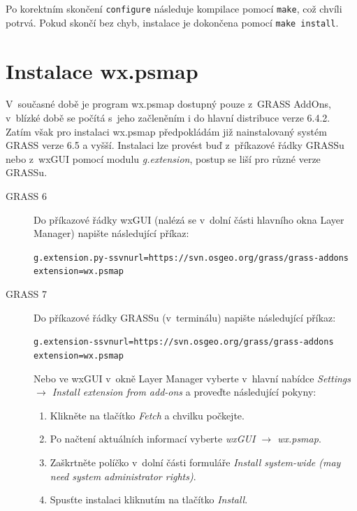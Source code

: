 \documentclass[a4paper,12pt,draft]{article}
\begin{document}
Po korektním skončení \verb|configure| následuje kompilace pomocí
\verb|make|, což chvíli potrvá. Pokud skončí bez chyb, instalace je
dokončena pomocí \verb|make install|.


\section{Instalace wx.psmap}
\label{priloha:instalace_GUI}
V~současné době je program wx.psmap dostupný pouze z~GRASS AddOns, v~blízké
době se počítá s~jeho začleněním i do hlavní distribuce verze 6.4.2. Zatím však
pro instalaci wx.psmap předpokládám již nainstalovaný systém GRASS verze 6.5
a vyšší. Instalaci lze provést buď z~příkazové řádky GRASSu nebo z~wxGUI pomocí
modulu \emph{g.extension}, postup se liší pro různé verze GRASSu.


\begin{description}
\item[GRASS 6]
Do příkazové řádky wxGUI (nalézá se v~dolní části hlavního okna Layer Manager)
napište následující příkaz:

\begin{alltt}
g.extension.py -s svnurl=https://svn.osgeo.org/grass/grass-addons
extension=wx.psmap
\end{alltt}

\item[GRASS 7]
Do příkazové řádky GRASSu (v~terminálu) napište následující příkaz:

\begin{alltt}
g.extension -s svnurl=https://svn.osgeo.org/grass/grass-addons
extension=wx.psmap
\end{alltt}

Nebo ve wxGUI v~okně Layer Manager vyberte v~hlavní nabídce
\emph{Settings $\rightarrow$ Install extension from add-ons} a proveďte
následující pokyny:
\begin{enumerate}
\item   Klikněte na tlačítko \emph{Fetch} a chvilku počkejte.
\item Po načtení aktuálních informací vyberte \emph{wxGUI $\rightarrow$ wx.psmap}.
\item Zaškrtněte políčko v~dolní části formuláře \emph{Install system-wide (may need system administrator rights)}.
\item Spusťte instalaci kliknutím na tlačítko \emph{Install}.
\end{enumerate}

\end{description}
\end{document}
